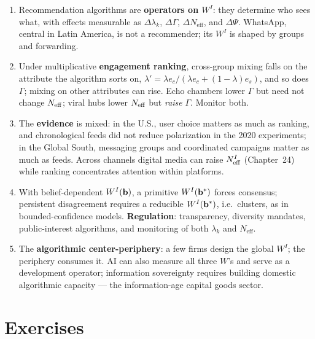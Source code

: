 \documentclass[../structural_economics_book.tex]{subfiles}
\begin{document}
\begin{enumerate}
\item Recommendation algorithms are \textbf{operators on $W^I$}: they determine who sees what, with effects measurable as $\Delta\lambda_k$, $\Delta\Gamma$, $\Delta N_{\text{eff}}$, and $\Delta\Psi$. WhatsApp, central in Latin America, is not a recommender; its $W^I$ is shaped by groups and forwarding.

\item Under multiplicative \textbf{engagement ranking}, cross-group mixing falls on the attribute the algorithm sorts on, $\lambda' = \lambda e_c/(\lambda e_c + (1-\lambda)e_s)$, and so does $\Gamma$; mixing on other attributes can rise. Echo chambers lower $\Gamma$ but need not change $N_{\text{eff}}$; viral hubs lower $N_{\text{eff}}$ but \emph{raise} $\Gamma$. Monitor both.

\item The \textbf{evidence} is mixed: in the U.S., user choice matters as much as ranking, and chronological feeds did not reduce polarization in the 2020 experiments; in the Global South, messaging groups and coordinated campaigns matter as much as feeds. Across channels digital media can raise $N_{\text{eff}}^I$ (Chapter~24) while ranking concentrates attention within platforms.

\item With belief-dependent $W^I(\mathbf{b})$, a primitive $W^I(\mathbf{b}^*)$ forces consensus; persistent disagreement requires a reducible $W^I(\mathbf{b}^*)$, i.e.\ clusters, as in bounded-confidence models. \textbf{Regulation}: transparency, diversity mandates, public-interest algorithms, and monitoring of both $\lambda_k$ and $N_{\text{eff}}$.

\item The \textbf{algorithmic center-periphery}: a few firms design the global $W^I$; the periphery consumes it. AI can also measure all three $W$'s and serve as a development operator; information sovereignty requires building domestic algorithmic capacity --- the information-age capital goods sector.
\end{enumerate}


\section{Exercises}
\label{ch27:sec:exercises}
\end{document}
